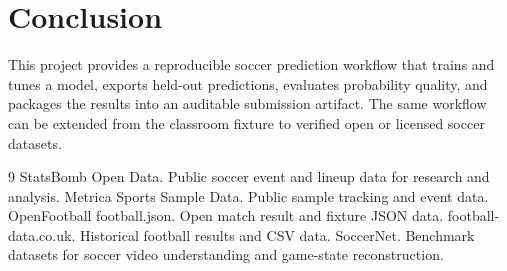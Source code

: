 \documentclass[11pt]{article}
\begin{document}
\section{Conclusion}
This project provides a reproducible soccer prediction workflow that trains and tunes a model, exports held-out predictions, evaluates probability quality, and packages the results into an auditable submission artifact. The same workflow can be extended from the classroom fixture to verified open or licensed soccer datasets.

\begin{thebibliography}{9}
 StatsBomb Open Data. Public soccer event and lineup data for research and analysis.
 Metrica Sports Sample Data. Public sample tracking and event data.
 OpenFootball football.json. Open match result and fixture JSON data.
 football-data.co.uk. Historical football results and CSV data.
 SoccerNet. Benchmark datasets for soccer video understanding and game-state reconstruction.
\end{thebibliography}
\end{document}
